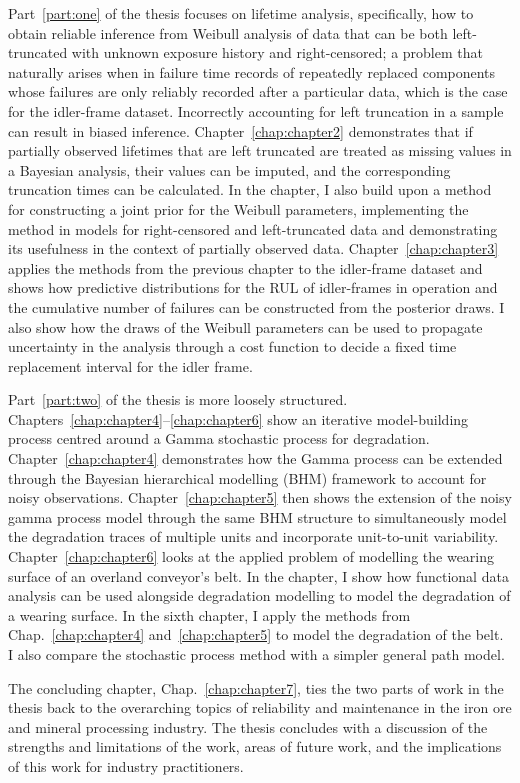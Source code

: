 Part~\ref{part:one} of the thesis focuses on lifetime analysis, specifically, how to obtain reliable inference from Weibull analysis of data that can be both left-truncated with unknown exposure history and right-censored; a problem that naturally arises when in failure time records of repeatedly replaced components whose failures are only reliably recorded after a particular data, which is the case for the idler-frame dataset. Incorrectly accounting for left truncation in a sample can result in biased inference. Chapter~\ref{chap:chapter2} demonstrates that if partially observed lifetimes that are left truncated are treated as missing values in a Bayesian analysis, their values can be imputed, and the corresponding truncation times can be calculated. In the chapter, I also build upon a method for constructing a joint prior for the Weibull parameters, implementing the method in models for right-censored and left-truncated data and demonstrating its usefulness in the context of partially observed data. Chapter~\ref{chap:chapter3} applies the methods from the previous chapter to the idler-frame dataset and shows how predictive distributions for the RUL of idler-frames in operation and the cumulative number of failures can be constructed from the posterior draws. I also show how the draws of the Weibull parameters can be used to propagate uncertainty in the analysis through a cost function to decide a fixed time replacement interval for the idler frame.

Part~\ref{part:two} of the thesis is more loosely structured. Chapters~\ref{chap:chapter4}--\ref{chap:chapter6} show an iterative model-building process centred around a Gamma stochastic process for degradation. Chapter~\ref{chap:chapter4} demonstrates how the Gamma process can be extended through the Bayesian hierarchical modelling (BHM) framework to account for noisy observations. Chapter~\ref{chap:chapter5} then shows the extension of the noisy gamma process model through the same BHM structure to simultaneously model the degradation traces of multiple units and incorporate unit-to-unit variability. Chapter~\ref{chap:chapter6} looks at the applied problem of modelling the wearing surface of an overland conveyor's belt. In the chapter, I show how functional data analysis can be used alongside degradation modelling to model the degradation of a wearing surface. In the sixth chapter, I apply the methods from Chap.~\ref{chap:chapter4} and~\ref{chap:chapter5} to model the degradation of the belt. I also compare the stochastic process method with a simpler general path model.

The concluding chapter, Chap.~\ref{chap:chapter7}, ties the two parts of work in the thesis back to the overarching topics of reliability and maintenance in the iron ore and mineral processing industry. The thesis concludes with a discussion of the strengths and limitations of the work, areas of future work, and the implications of this work for industry practitioners.
